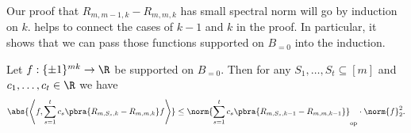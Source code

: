 Our proof that $R_{m,m-1,k}-R_{m,m,k}$ has small spectral norm will go by induction on $k$.  helps to connect the cases of $k-1$ and $k$ in the proof. In particular, it shows that we can pass those functions supported on $B_{=0}$ into the induction.

\begin{lemma}\label{lemma:f supported on B0}
    Let $f:\{\pm1\}^{mk}\to \R$ be supported on $B_{=0}$. Then for any $S_1,\dots,S_t\subseteq[m]$ and $c_1,\dots,c_t\in\R$ we have
    \begin{align*}
        \abs{\left\langle f,\sum_{s=1}^t c_s \pbra{R_{m,S_s,k}-R_{m,m,k}}f\right\rangle }\leq \norm{\sum_{s=1}^t c_s \pbra{R_{m,S_s,k-1}-R_{m,m,k-1}}}_{\mathrm{op}}\cdot\norm{f}_2^2.
    \end{align*}
\end{lemma}
